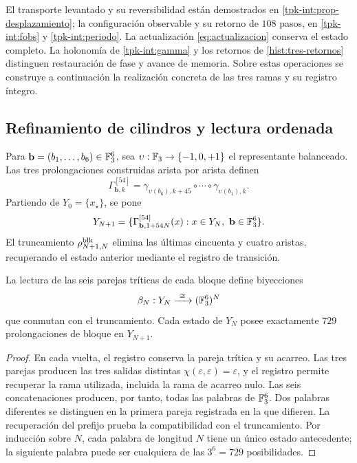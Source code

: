 El transporte levantado y su reversibilidad están demostrados en \ref{tpk-int:prop-desplazamiento}; la configuración observable y su retorno de $108$ pasos, en \ref{tpk-int:fobs} y \ref{tpk-int:periodo}. La actualización \eqref{eq:actualizacion} conserva el estado completo. La holonomía de \ref{tpk-int:gamma} y los retornos de \ref{hist:tres-retornos} distinguen restauración de fase y avance de memoria. Sobre estas operaciones se construye a continuación la realización concreta de las tres ramas y su registro íntegro.



\subsection{Refinamiento de cilindros y lectura ordenada}
\label{hmtfg:refinamiento-ordenado}

Para \(\mathbf b=(b_1,\ldots,b_6)\in\mathbb F_3^6\), sea
\(\upsilon:\mathbb F_3\to\{-1,0,+1\}\) el representante balanceado.
Las tres prolongaciones construidas arista por arista definen
\[
 \Gamma^{[54]}_{\mathbf b,k}
 =\gamma_{\upsilon(b_6),k+45}\circ\cdots\circ
   \gamma_{\upsilon(b_1),k}.
\]
Partiendo de \(Y_0=\{x_\star\}\), se pone
\[
 Y_{N+1}
 =\{\Gamma^{[54]}_{\mathbf b,1+54N}(x):
          x\in Y_N,\ \mathbf b\in\mathbb F_3^6\}.
\]
El truncamiento \(\rho^{\rm blk}_{N+1,N}\) elimina las últimas
cincuenta y cuatro aristas, recuperando el estado anterior mediante
el registro de transición.

\begin{proposition}
\label{hmtfg:bloques-729}
La lectura de las seis parejas tríticas de cada bloque define biyecciones
\[
 \beta_N:Y_N\xrightarrow{\ \cong\ }(\FF_3^6)^N
\]
que conmutan con el truncamiento. Cada estado de \(Y_N\) posee
exactamente \(729\) prolongaciones de bloque en \(Y_{N+1}\).
\end{proposition}
\begin{proof}
En cada vuelta, el registro conserva la pareja trítica y su acarreo.
Las tres parejas producen las tres salidas distintas
\(\chi(\varepsilon,\varepsilon)=\varepsilon\), y el registro permite
recuperar la rama utilizada, incluida la rama de acarreo nulo.
Las seis concatenaciones producen, por tanto, todas las palabras de
\(\mathbb F_3^6\). Dos palabras diferentes se distinguen en la primera pareja
registrada en la que difieren. La recuperación del prefijo prueba la
compatibilidad con el truncamiento. Por inducción sobre \(N\), cada
palabra de longitud \(N\) tiene un único estado antecedente; la siguiente
palabra puede ser cualquiera de las \(3^6=729\) posibilidades.
\end{proof}

